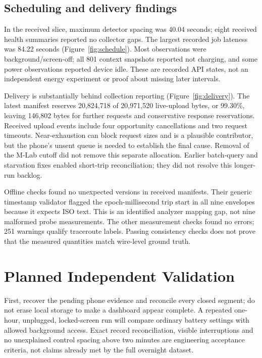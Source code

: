 \subsection{Scheduling and delivery findings}
In the received slice, maximum detector spacing was 40.04 seconds; eight
received health summaries reported no collector gaps. The largest recorded job
lateness was 84.22 seconds (Figure~\ref{fig:schedule}). Most observations were
background/screen-off; all 801 context snapshots reported not charging, and some
power observations reported device idle. These are recorded API states, not an
independent energy experiment or proof about missing later intervals.



Delivery is substantially behind collection reporting (Figure~\ref{fig:delivery}).
The latest manifest reserves 20,824,718 of 20,971,520 live-upload bytes, or
99.30\%, leaving 146,802 bytes for further requests and conservative response
reservations. Received upload events include four opportunity cancellations and
two request timeouts. Near-exhaustion can block request sizes and is a plausible
contributor, but the phone's unsent queue is needed to establish the final cause.
Removal of the M-Lab cutoff did not remove this separate allocation. Earlier
batch-query and starvation fixes enabled short-trip reconciliation; they did not
resolve this longer-run backlog.



Offline checks found no unexpected versions in received manifests. Their generic
timestamp validator flagged the epoch-millisecond trip start in all nine
envelopes because it expects ISO text. This is an identified analyzer mapping
gap, not nine malformed probe measurements. The other measurement checks found
no errors; 251 warnings qualify traceroute labels. Passing consistency checks
does not prove that the measured quantities match wire-level ground truth.

\section{Planned Independent Validation}
First, recover the pending phone evidence and reconcile every closed segment; do not erase
local storage to make a dashboard appear complete. A repeated one-hour,
unplugged, locked-screen run will compare ordinary battery settings with allowed
background access. Exact record reconciliation, visible interruptions and no
unexplained control spacing above two minutes are engineering acceptance
criteria, not claims already met by the full overnight dataset.

